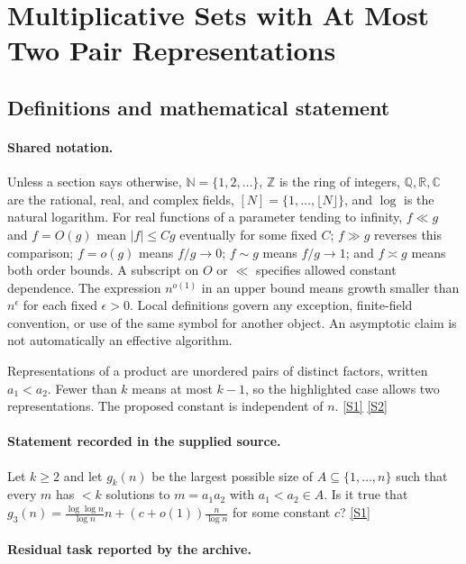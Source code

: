 \documentclass[11pt,a4paper]{article}
\newcommand{\N}{\mathbb{N}}
\newcommand{\Z}{\mathbb{Z}}
\newcommand{\Q}{\mathbb{Q}}
\newcommand{\R}{\mathbb{R}}
\newcommand{\C}{\mathbb{C}}
\newcommand{\sref}[2]{\hyperlink{source:#1:#2}{[S#2]}}
\begin{document}
\section{Multiplicative Sets with At Most Two Pair Representations}\label{statement}


\subsection{Definitions and mathematical statement}

\paragraph{Shared notation.}Unless a section says otherwise, $\N=\{1,2,\ldots\}$,
$\Z$ is the ring of integers, $\Q,\R,\C$ are the rational, real, and complex
fields, $[N]=\{1,\ldots,\lfloor N\rfloor\}$, and $\log$ is the natural
logarithm. For real functions of a parameter tending to infinity,
$f\ll g$ and $f=O(g)$ mean $|f|\leq Cg$ eventually for some fixed $C$;
$f\gg g$ reverses this comparison; $f=o(g)$ means $f/g\to0$;
$f\sim g$ means $f/g\to1$; and $f\asymp g$ means both order bounds.
A subscript on $O$ or $\ll$ specifies allowed constant dependence.
The expression $n^{o(1)}$ in an upper bound means growth smaller than
$n^\epsilon$ for each fixed $\epsilon>0$. Local definitions govern any
exception, finite-field convention, or use of the same symbol for another
object. An asymptotic claim is not automatically an effective algorithm.



Representations of a product are unordered pairs of distinct factors, written $a_1<a_2$. Fewer than $k$ means at most $k-1$, so the highlighted case allows two representations. The proposed constant is independent of $n$. \sref{statement}{1} \sref{statement}{2}

\paragraph{Statement recorded in the supplied source.}
Let $k\geq 2$ and let $g_k(n)$ be the largest possible size of $A\subseteq \{1,\ldots,n\}$ such that every $m$ has $<k$ solutions to $m=a_1a_2$ with $a_1<a_2\in A$.
Is it true that $ g_3(n)=\frac{\log\log n}{\log n}n+(c+o(1))\frac{n}{\log n} $ for some constant $c$? \sref{statement}{1}

\paragraph{Residual task reported by the archive.}
\end{document}
